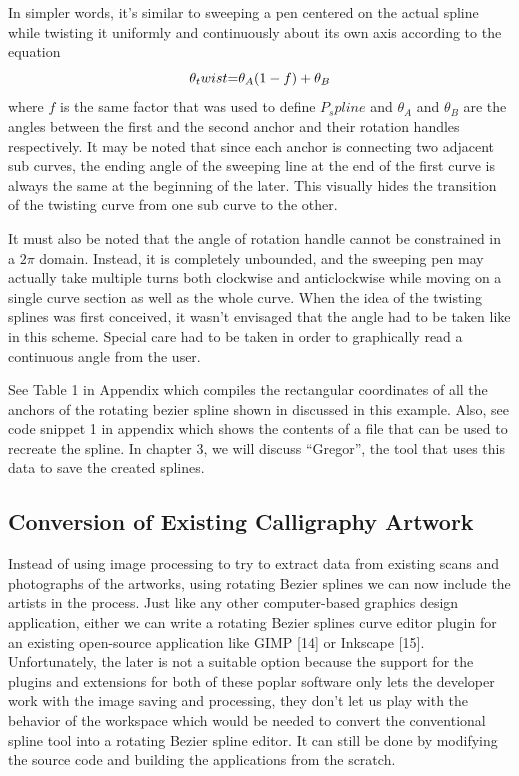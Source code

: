     In simpler words, it’s similar to sweeping a pen centered on the actual spline while twisting it uniformly and continuously about its own axis according to the equation
    \begin{equation}
    \theta_twist$$=$$\theta_A  (1-f)+ \theta_B
    \end{equation}
    where $f$ is the same factor that was used to define $P_spline$ and $\theta_A$ and $\theta_B$ are the angles between the first and the second anchor and their rotation handles respectively. It may be noted that since each anchor is connecting two adjacent sub curves, the ending angle of the sweeping line at the end of the first curve is always the same at the beginning of the later. This visually hides the transition of the twisting curve from one sub curve to the other.

    It must also be noted that the angle of rotation handle cannot be constrained in a $2\pi$ domain. Instead, it is completely unbounded, and the sweeping pen may actually take multiple turns both clockwise and anticlockwise while moving on a single curve section as well as the whole curve. When the idea of the twisting splines was first conceived, it wasn’t envisaged that the angle had to be taken like in this scheme. Special care had to be taken in order to graphically read a continuous angle from the user.

    See Table 1 in Appendix which compiles the rectangular coordinates of all the anchors of the rotating bezier spline shown in discussed in this example. Also, see code snippet 1 in appendix which shows the contents of a file that can be used to recreate the spline. In chapter 3, we will discuss “Gregor”, the tool that uses this data to save the created splines.

\subsection{Conversion of Existing Calligraphy Artwork}
Instead of using image processing to try to extract data from existing scans and photographs of the artworks, using rotating Bezier splines we can now include the artists in the process. Just like any other computer-based graphics design application, either we can write a rotating Bezier splines curve editor plugin for an existing open-source application like GIMP [14] or Inkscape [15]. Unfortunately, the later is not a suitable option because the support for the plugins and extensions for both of these poplar software only lets the developer work with the image saving and processing, they don’t let us play with the behavior of the workspace which would be needed to convert the conventional spline tool into a rotating Bezier spline editor. It can still be done by modifying the source code and building the applications from the scratch.

